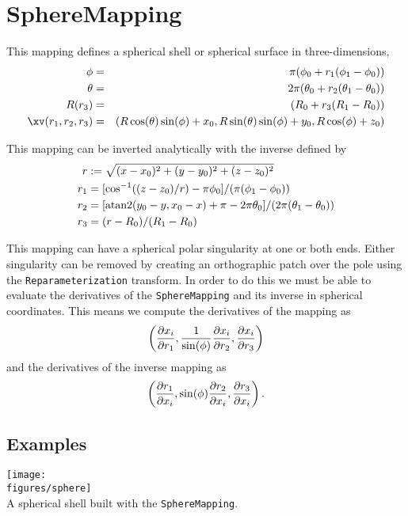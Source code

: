 \section{SphereMapping}

This mapping defines a spherical shell or spherical surface in three-dimensions, 
\begin{eqnarray*}
\phi &=&  \pi( \phi_0 + r_1( \phi_1-\phi_0) ) \\
\theta &=&  2\pi( \theta_0 + r_2( \theta_1-\theta_0) ) \\
R(r_3) &=& (R_0 + r_3 (R_1-R_0)) \\
\xv(r_1,r_2,r_3) &=& ( R\cos( \theta )\sin(\phi) + x_0 , 
                       R\sin(\theta)\sin(\phi) + y_0 ,
                       R\cos(\phi)+z_0 )
\end{eqnarray*}


This mapping can be inverted analytically with the inverse defined by
\begin{align*}
    r &:= \sqrt{ (x-x_0)^2 + (y-y_0)^2 + (z-z_0)^2 } \\
  r_1 &= [ \cos^{-1}( (z-z_0)/r ) - \pi \phi_0 ] /( \pi(\phi_1-\phi_0)) \\
  r_2 &= [ {\rm atan2}( y_0-y, x_0-x ) + \pi -2\pi\theta_0 ]/( 2\pi(\theta_1-\theta_0)) \\
  r_3 &= (r-R_0)/(R_1-R_0)
\end{align*}

This mapping can have a spherical polar singularity at one or both ends. Either singularity
can be removed by creating an orthographic patch over the pole using the {\tt Reparameterization}
transform. In order to do this we must be able to evaluate the derivatives of the 
{\tt SphereMapping} and its inverse in spherical coordinates.
This means we compute the derivatives of the mapping as
\[
   \left({\partial x_i \over\partial r_1},{1\over\sin(\phi)}{\partial x_i \over\partial r_2},
         {\partial x_i \over\partial r_3} \right)
\]
and the derivatives of the inverse mapping as
\[
   \left({\partial r_1\over\partial x_i},\sin(\phi){\partial r_2 \over\partial x_i},
         {\partial r_3\over\partial x_i} \right).
\]


\subsection{Examples}

\noindent
\begin{minipage}{.4\linewidth}
{\footnotesize
{}
}
\end{minipage}\hfill
\begin{minipage}{.6\linewidth}
  \begin{center}
   \texttt{[image: \\figures/sphere]} \\
  {A spherical shell built with the {\tt SphereMapping}.}
  \end{center}
\end{minipage}

